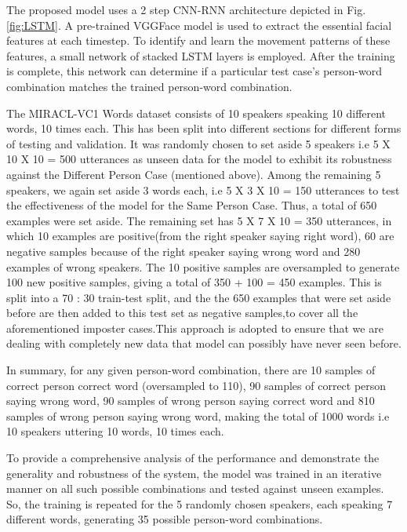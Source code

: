 \documentclass[letterpaper]{article}
\begin{document}
The proposed model uses a 2 step CNN-RNN architecture depicted in Fig. \ref{fig:LSTM}. A pre-trained VGGFace model \cite{vggface} is used to extract the essential facial features at each timestep. To identify and learn the movement patterns of these features, a small network of stacked LSTM layers is employed. After the training is complete, this network can determine if a particular test case's person-word combination matches the trained person-word combination.

The MIRACL-VC1 Words dataset consists of 10 speakers speaking 10 different words, 10 times each. This has been split into different sections for different forms of testing and validation. It was randomly chosen to set aside 5 speakers i.e 5 X 10 X 10 = 500 utterances as unseen data for the model to exhibit its robustness against the Different Person Case (mentioned above). Among the remaining 5 speakers, we again set aside 3 words each, i.e 5 X 3 X 10 = 150 utterances to test the effectiveness of the model for the Same Person Case. Thus, a total of 650 examples were set aside. The remaining set has 5 X 7 X 10 = 350 utterances, in which 10 examples are positive(from the right speaker saying right word), 60 are negative samples because of the right speaker saying wrong word and 280 examples of wrong speakers. The 10 positive samples are oversampled to generate 100 new positive samples, giving a total of 350 + 100 = 450 examples. This is split into a 70 : 30 train-test split, and the the 650 examples that were set aside before are then added to this test set as negative samples,to cover all the aforementioned imposter cases.This approach is adopted to ensure that we are dealing with completely new data that model can possibly have never seen before.

In summary, for any given person-word combination, there are 10 samples of correct person correct word (oversampled to 110), 90 samples of correct person saying wrong word, 90 samples of wrong person saying correct word and 810 samples of wrong person saying wrong word, making the total of 1000 words i.e 10 speakers uttering 10 words, 10 times each.

To provide a comprehensive analysis of the performance and demonstrate the generality and robustness of the system, the model was trained in an iterative manner on all such possible combinations and tested against unseen examples. So, the training is repeated for the 5 randomly chosen speakers, each speaking 7 different words, generating 35 possible person-word combinations. 
\end{document}
